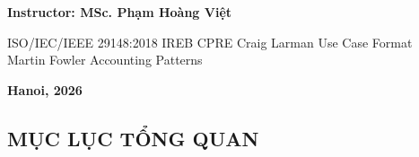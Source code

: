 \documentclass[11pt,a4paper]{article}
\begin{document}
\begin{titlepage}
\vspace{0.8cm}
{\large\bfseries Instructor: MSc. Phạm Hoàng Việt\par}

\vfill
{\small\itshape
\begin{center}
  ISO/IEC/IEEE 29148:2018 \textbullet{} IREB CPRE \textbullet{} Craig Larman Use Case Format\\
  Martin Fowler Accounting Patterns
\end{center}
\par}
\vspace{0.5cm}
{\large\bfseries Hanoi, 2026\par}
\end{titlepage}

\subsection*{MỤC LỤC TỔNG QUAN}\label{mux1ee5c-lux1ee5c-tux1ed5ng-quan}
\end{document}
